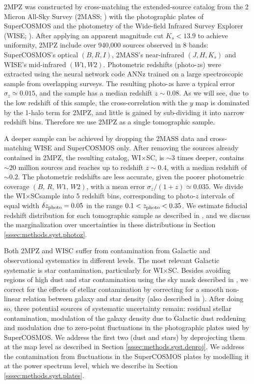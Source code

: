 \documentclass[useAMS,usenatbib]{mn2e}
\newcommand{\wisc}{WI$\times$SC}
\begin{document}
    2MPZ was constructed by cross-matching the extended-source catalog from the 2 Micron All-Sky Survey (2MASS; \citep{2006AJ....131.1163S,2000AJ....119.2498J}) with the photographic plates of SuperCOSMOS \cite{2001MNRAS.326.1295H,2016MNRAS.462.2085P} and the photometry of the Wide-field Infrared Survey Explorer (WISE; \cite{2010AJ....140.1868W}). After applying an apparent magnitude cut $K_s<13.9$ to achieve uniformity, 2MPZ include over 940,000 sources observed in 8 bands: SuperCOSMOS's optical $(B,R,I)$, 2MASS's near-infrared $(J,H,K_s)$ and WISE's mid-infrared $(W1,W2)$. Photometric redshifts (photo-$z$s) were extracted using the neural network code ANNz \cite{2004PASP..116..345C} trained on a large spectroscopic sample from overlapping surveys. The resulting photo-$z$s have a typical error $\sigma_z\simeq0.015$, and the sample has a median redshift $z\sim0.08$. As we will see, due to the low redshift of this sample, the cross-correlation with the $y$ map is dominated by the 1-halo term for 2MPZ, and little is gained by sub-dividing it into narrow redshift bins. Therefore we use 2MPZ as a single tomographic sample.
    
    A deeper sample can be achieved by dropping the 2MASS data and cross-matching WISE and SuperCOSMOS only. After removing the sources already contained in 2MPZ, the resulting catalog, \wisc, is $\sim$3 times deeper, contains $\sim20$ million sources and reaches up to redshift $z\sim0.4$, with a median redshift of $\sim0.2$. The photometric redshifts are less accurate, given the poorer photometric coverage $(B,\,R,\,W1,\,W2)$, with a mean error $\sigma_z/(1+z)\simeq0.035$. We divide the \wisc sample into 5 redshift bins, corresponding to photo-$z$ intervals of equal width $\delta z_{\rm photo}=0.05$ in the range $0.1<z_{\rm photo}<0.35$. We estimate fiducial redshift distribution for each tomographic sample as described in \cite{2018MNRAS.481.1133P}, and we discuss the marginalization over uncertainties in these distributions in Section \ref{sssec:methods.syst.photoz}.

    Both 2MPZ and WISC suffer from contamination from Galactic and observational systematics in different levels. The most relevant Galactic systematic is star contamination, particularly for \wisc \cite{2018arXiv181208182X}. Besides avoiding regions of high dust and star contamination using the sky mask described in \cite{2018MNRAS.481.1133P}, we correct for the effects of stellar contamination by correcting for a smooth non-linear relation between galaxy and star density (also described in \cite{2018MNRAS.481.1133P}). After doing so, three potential sources of systematic uncertainty remain: residual stellar contamination, modulation of the galaxy density due to Galactic dust reddening and modulation due to zero-point fluctuations in the photographic plates used by SuperCOSMOS. We address the first two (dust and stars) by deprojecting them at the map level as described in Section \ref{sssec:methods.syst.deproj}. We address the contamination from fluctuations in the SuperCOSMOS plates by modelling it at the power spectrum level, which we describe in Section \ref{sssec:methods.syst.plates}.
\end{document}
